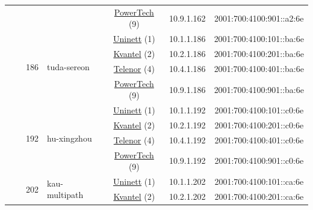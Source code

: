 \begin{small}
\begin{center}
\begin{longtable}{|c|c|c|c|c|c|c|c|}
  &  &  &  & \multicolumn{2}{|c|}{\tiny{\href{http://www.powertech.no}{PowerTech} (9)}} & \tiny{10.9.1.162} & \tiny{2001:700:4100:901::a2:6e} \\* \cline{3-3}\cline{4-4}\cline{5-5}\cline{6-6}\cline{7-7}\cline{8-8}
  &  & \multirow{4}{*}{\tiny{186}} & \multicolumn{1}{|l|}{\multirow{4}{*}{\tiny{tuda-sereon}}} & \multicolumn{2}{|c|}{\tiny{\href{https://www.uninett.no}{Uninett} (1)}} & \tiny{10.1.1.186} & \tiny{2001:700:4100:101::ba:6e} \\* \cline{5-5}\cline{6-6}\cline{7-7}\cline{8-8}
  &  &  &  & \multicolumn{2}{|c|}{\tiny{\href{http://kvantel.no}{Kvantel} (2)}} & \tiny{10.2.1.186} & \tiny{2001:700:4100:201::ba:6e} \\* \cline{5-5}\cline{6-6}\cline{7-7}\cline{8-8}
  &  &  &  & \multicolumn{2}{|c|}{\tiny{\href{https://www.telenor.no}{Telenor} (4)}} & \tiny{10.4.1.186} & \tiny{2001:700:4100:401::ba:6e} \\* \cline{5-5}\cline{6-6}\cline{7-7}\cline{8-8}
  &  &  &  & \multicolumn{2}{|c|}{\tiny{\href{http://www.powertech.no}{PowerTech} (9)}} & \tiny{10.9.1.186} & \tiny{2001:700:4100:901::ba:6e} \\* \cline{3-3}\cline{4-4}\cline{5-5}\cline{6-6}\cline{7-7}\cline{8-8}
  &  & \multirow{4}{*}{\tiny{192}} & \multicolumn{1}{|l|}{\multirow{4}{*}{\tiny{hu-xingzhou}}} & \multicolumn{2}{|c|}{\tiny{\href{https://www.uninett.no}{Uninett} (1)}} & \tiny{10.1.1.192} & \tiny{2001:700:4100:101::c0:6e} \\* \cline{5-5}\cline{6-6}\cline{7-7}\cline{8-8}
  &  &  &  & \multicolumn{2}{|c|}{\tiny{\href{http://kvantel.no}{Kvantel} (2)}} & \tiny{10.2.1.192} & \tiny{2001:700:4100:201::c0:6e} \\* \cline{5-5}\cline{6-6}\cline{7-7}\cline{8-8}
  &  &  &  & \multicolumn{2}{|c|}{\tiny{\href{https://www.telenor.no}{Telenor} (4)}} & \tiny{10.4.1.192} & \tiny{2001:700:4100:401::c0:6e} \\* \cline{5-5}\cline{6-6}\cline{7-7}\cline{8-8}
  &  &  &  & \multicolumn{2}{|c|}{\tiny{\href{http://www.powertech.no}{PowerTech} (9)}} & \tiny{10.9.1.192} & \tiny{2001:700:4100:901::c0:6e} \\* \cline{3-3}\cline{4-4}\cline{5-5}\cline{6-6}\cline{7-7}\cline{8-8}
  &  & \multirow{4}{*}{\tiny{202}} & \multicolumn{1}{|l|}{\multirow{4}{*}{\tiny{kau-multipath}}} & \multicolumn{2}{|c|}{\tiny{\href{https://www.uninett.no}{Uninett} (1)}} & \tiny{10.1.1.202} & \tiny{2001:700:4100:101::ca:6e} \\* \cline{5-5}\cline{6-6}\cline{7-7}\cline{8-8}
  &  &  &  & \multicolumn{2}{|c|}{\tiny{\href{http://kvantel.no}{Kvantel} (2)}} & \tiny{10.2.1.202} & \tiny{2001:700:4100:201::ca:6e} \\* \cline{5-5}\cline{6-6}\cline{7-7}\cline{8-8}

\end{longtable}
\end{center}
\end{small}
